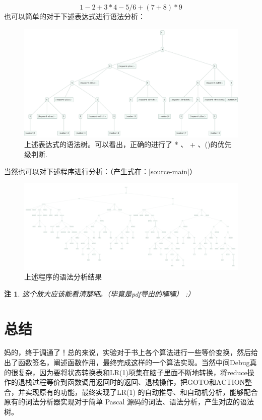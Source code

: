 \documentclass[lang=cn]{ctexart}
\newtheorem{remark}{注}
\begin{document}
{$$
1 - 2 + 3 * 4 - 5 / 6 + (7 + 8) * 9
$$
也可以简单的对于下述表达式进行语法分析：
\begin{figure}[H]
	\centering
	\includegraphics[width=0.7\linewidth]{pic/expr}
	\caption{上述表达式的语法树。可以看出，正确的进行了 * 、 + 、()的优先级判断.}
	\label{fig:expr}
\end{figure}

当然也可以对下述程序进行分析：（产生式在：\ref{source-main}）


\begin{figure}[H]
	\centering
	\includegraphics[width=0.7\linewidth]{pic/a-large-program}
	\caption{上述程序的语法分析结果}
	\label{fig:a-large-program}
\end{figure}

\begin{remark}
	这个放大应该能看清楚吧。（毕竟是pdf导出的嘿嘿） :）
\end{remark}

\section{总结}

{\tiny 妈的}，终于调通了！总的来说，实验对于书上各个算法进行一些等价变换，然后给出了函数签名，阐述函数作用，最终完成这样的一个算法实现。当然中间Debug真的很复杂，因为要将状态转换表和LR(1)项集在脑子里面不断地转换，将reduce操作的退栈过程等价到函数调用返回时的返回、退栈操作，把$\mathrm{GOTO}$和$\mathrm{ACTION}$整合，并实现原有的功能，最终实现了LR(1) 的自动推导、和自动机分析，能够配合原有的词法分析器实现对于简单 Pascal 源码的词法、语法分析，产生对应的语法树。

}
\end{document}
